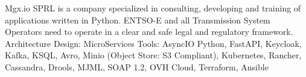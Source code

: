 \documentclass[
  a4paper,
]{fortysecondscv}
\begin{document}
\makefrontsidebar

\begin{cvtable}
    {Mgx.io SPRL is a company specialized in consulting, developing and training
     of applications written in Python.  }
    {ENTSO-E and all Transmission System Operators need to operate in a clear and safe legal and regulatory framework. 
     Architecture Design: MicroServices
     Tools: AsyncIO Python, FastAPI, Keycloak, Kafka, KSQL, Avro, Minio (Object
     Store: S3 Compliant), Kubernetes, Rancher, Cassandra, Drools, MJML, SOAP
     1.2, OVH Cloud, Terraform, Ansible
    }
\end{cvtable}
\end{document}
